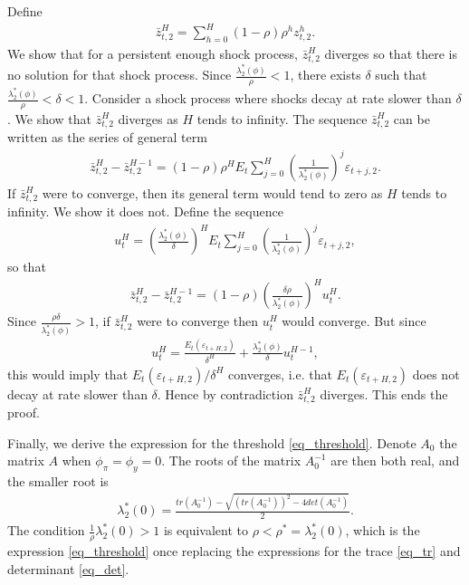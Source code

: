 Define
\begin{align}
\bar{z}_{t,2}^H = \sum_{h=0}^H (1-\rho) \rho^h z_{t,2}^{h}.
\end{align}
We show that for a persistent enough shock process, $\bar{z}_{t,2}^H$ diverges so that there is no solution for that shock process. Since $\frac{\lambda_2^*(\phi)}{\rho}<1$, there exists $\delta$ such that $\frac{\lambda_2^*(\phi)}{\rho}<\delta<1$. Consider a shock process where shocks decay at rate slower than $\delta$. We show that $\bar{z}_{t,2}^H$ diverges as $H$ tends to infinity. The sequence $\bar{z}_{t,2}^H$ can be written as the series of general term
\begin{align}
\bar{z}_{t,2}^H - \bar{z}_{t,2}^{H-1} = (1-\rho) \rho^H E_t\sum_{j=0}^{H} \left(\frac{1}{\lambda_2^*(\phi)}\right)^j \varepsilon_{t+j,2}.
\end{align}
If $\bar{z}_{t,2}^H$ were to converge, then its general term would tend to zero as $H$ tends to infinity. We show it does not. Define the sequence
\begin{align}
u_t^H = \left(\frac{\lambda_2^*(\phi)}{\delta}\right)^H E_t\sum_{j=0}^{H} \left(\frac{1}{\lambda_2^*(\phi)}\right)^j \varepsilon_{t+j,2},
\end{align}
so that 
\begin{align}
\bar{z}_{t,2}^H - \bar{z}_{t,2}^{H-1} = (1-\rho) \left(\frac{\delta \rho}{\lambda_2^*(\phi)}\right)^H u_t^H.
\end{align}
Since $\frac{\rho \delta}{\lambda_2^*(\phi)}>1$, if $\bar{z}_{t,2}^H$ were to converge then $u_t^H$ would converge. But since 
\begin{align}
u_t^H = \frac{E_t(\varepsilon_{t+H,2})}{\delta^H} + \frac{\lambda_2^*(\phi)}{\delta} u_{t}^{H-1},
\end{align}
this would imply that $E_t(\varepsilon_{t+H,2})/\delta^H$ converges, i.e. that $E_t(\varepsilon_{t+H,2})$ does not decay at rate slower than $\delta$. Hence by contradiction $\bar{z}_{t,2}^H$ diverges. This ends the proof.

Finally, we derive the expression for the threshold \eqref{eq_threshold}. Denote $A_0$ the matrix $A$ when $\phi_{\pi}=\phi_y=0$. The roots of the matrix $A_0^{-1}$ are then both real, and the smaller root is
\begin{align}
\lambda_2^*(0) = \frac{tr(A_0^{-1})-\sqrt{(tr(A_0^{-1}))^2-4det(A_0^{-1})}}{2}.
\end{align}
The condition $\frac{1}{\rho}\lambda_2^*(0)>1$ is equivalent to $\rho<\rho^*=\lambda_2^*(0)$, which is the expression \eqref{eq_threshold} once replacing the expressions for the trace \eqref{eq_tr} and determinant \eqref{eq_det}.

